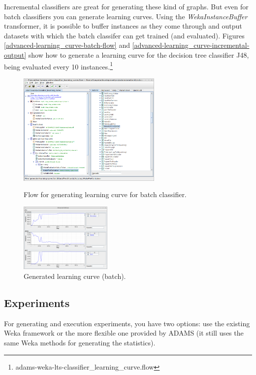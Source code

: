Incremental classifiers are great for generating these kind of graphs. But
even for batch classifiers you can generate learning curves. Using the 
\textit{WekaInstanceBuffer} transformer, it is possible to buffer instances as
they come through and output datasets with which the batch classifer can get
trained (and evaluated). Figures \ref{advanced-learning_curve-batch-flow} and
\ref{advanced-learning_curve-incremental-output} show how to generate a 
learning curve for the decision tree classifier J48, being evaluated every
10 instances.\footnote{adams-weka-lts-classifier\_learning\_curve.flow}

\begin{figure}[ht]
  \begin{minipage}[t]{0.55\linewidth}
    \centering
    \includegraphics[width=7.0cm]{images/advanced-learning_curve-batch-flow.png}
    \caption{Flow for generating learning curve for batch classifier.}
    \label{advanced-learning_curve-batch-flow}
  \end{minipage}
  \hspace{0.5cm}
  \begin{minipage}[t]{0.45\linewidth}
    \centering
    \includegraphics[width=4.5cm]{images/advanced-learning_curve-batch-output.png}
    \caption{Generated learning curve (batch).}
    \label{advanced-learning_curve-batch-output}
  \end{minipage}
\end{figure}

\subsection{Experiments}
For generating and execution experiments, you have two options: use the
existing Weka framework or the more flexible one provided by ADAMS (it
still uses the same Weka methods for generating the statistics).


